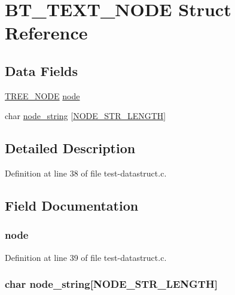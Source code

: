 \hypertarget{struct_b_t___t_e_x_t___n_o_d_e}{\section{B\-T\-\_\-\-T\-E\-X\-T\-\_\-\-N\-O\-D\-E Struct Reference}
\label{struct_b_t___t_e_x_t___n_o_d_e}
}
\subsection*{Data Fields}
\begin{DoxyCompactItemize}
\item 
\hyperlink{btacc_8h_a401cf184fc63368a8957143cbb772739}{T\-R\-E\-E\-\_\-\-N\-O\-D\-E} \hyperlink{struct_b_t___t_e_x_t___n_o_d_e_acdebf5c3c6a27c5ebd53e9854ae24214}{node}
\item 
char \hyperlink{struct_b_t___t_e_x_t___n_o_d_e_a439163d1128851bc0af07ccf58cd299e}{node\-\_\-string} \mbox{[}\hyperlink{test-datastruct_8c_a255013a24c881be111ab757fc0a28dfb}{N\-O\-D\-E\-\_\-\-S\-T\-R\-\_\-\-L\-E\-N\-G\-T\-H}\mbox{]}
\end{DoxyCompactItemize}


\subsection{Detailed Description}


Definition at line 38 of file test-\/datastruct.\-c.



\subsection{Field Documentation}
\hypertarget{struct_b_t___t_e_x_t___n_o_d_e_acdebf5c3c6a27c5ebd53e9854ae24214}{
\subsubsection[{node}]{ node}}\label{struct_b_t___t_e_x_t___n_o_d_e_acdebf5c3c6a27c5ebd53e9854ae24214}


Definition at line 39 of file test-\/datastruct.\-c.

\hypertarget{struct_b_t___t_e_x_t___n_o_d_e_a439163d1128851bc0af07ccf58cd299e}{
\subsubsection[{node\-\_\-string}]{\setlength{\rightskip}{0pt plus 5cm}char node\-\_\-string\mbox{[}{\bf N\-O\-D\-E\-\_\-\-S\-T\-R\-\_\-\-L\-E\-N\-G\-T\-H}\mbox{]}}}\label{struct_b_t___t_e_x_t___n_o_d_e_a439163d1128851bc0af07ccf58cd299e}


